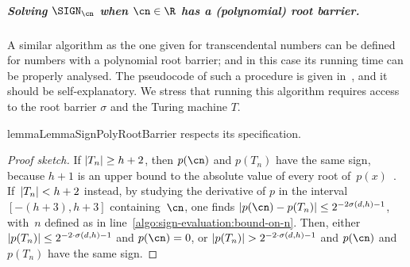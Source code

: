 \subparagraph*{Solving {\rm$\SIGN_{\cn}$} when $\cn \in \R$ has a (polynomial) root barrier.}
A similar algorithm as the one given for transcendental numbers can be defined
for numbers with a polynomial root barrier; and in this case its running time
can be properly analysed. The pseudocode of such a procedure is given
in~, and it should be self-explanatory. We stress
that running this algorithm requires access to the root barrier $\sigma$ and the
Turing machine $T$.

\begin{restatable}{lemma}{LemmaSignPolyRootBarrier}
  \label{lemma:sign-poly-root-barrier}
   respects its specification.
\end{restatable}

\begin{proof}[Proof sketch] 
  If $\left|T_n\right| \geq h+2$, then $p(\cn)$ and $p(T_n)$ have the same sign,
  because $h+1$ is an upper bound to the absolute value of every root
  of~$p(x)$~\cite[Chapter 8]{Rahman02}. If~$\left|T_n\right| < h+2$ instead, by
  studying the derivative of $p$ in the interval ${[-(h+3),h+3]}$
  containing~$\cn$, one finds $\abs{p(\cn)-p(T_n)} \leq 2^{-2\sigma(d,h)-1}$,
  with~$n$ defined as in line~\ref{algo:sign-evaluation:bound-on-n}. Then,
  either $\left|p(T_n)\right| \leq 2^{-2 \cdot \sigma(d,h)-1}$ and $p(\cn) = 0$, or
  $\left|p(T_n)\right| > 2^{-2 \cdot \sigma(d,h)-1}$ and $p(\cn)$ and $p(T_n)$ have the
  same sign.
\end{proof}



